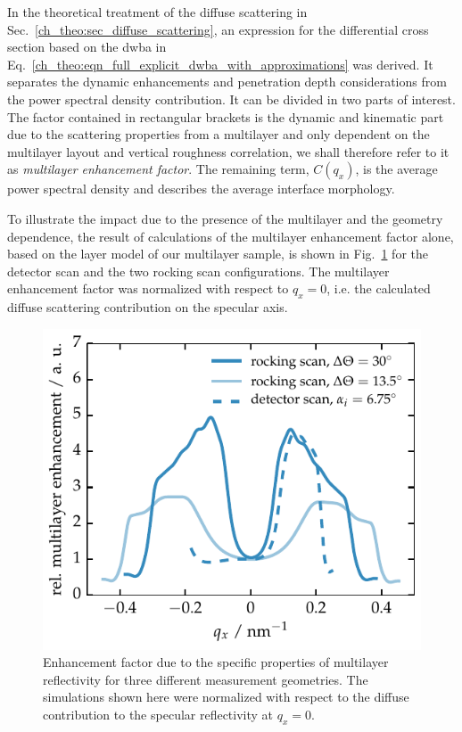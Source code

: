 In the theoretical treatment of the diffuse scattering in Sec.~\ref{ch_theo:sec_diffuse_scattering}, an expression for the differential cross section based on the \gls{dwba} in Eq.~\eqref{ch_theo:eqn_full_explicit_dwba_with_approximations} was derived. It separates the dynamic enhancements and penetration depth considerations from the power spectral density contribution. It can be divided in two parts of interest. The factor contained in rectangular brackets is the dynamic and kinematic part due to the scattering properties from a multilayer and only dependent on the multilayer layout and vertical roughness correlation, we shall therefore refer to it as \emph{multilayer enhancement factor}. The remaining term, $C(q_x)$, is the average power spectral density and describes the average interface morphology.

To illustrate the impact due to the presence of the multilayer and the geometry dependence, the result of calculations of the multilayer enhancement factor alone, based on the layer model of our multilayer sample, is shown in Fig.~\ref{ch_diff:fig_PTB17_multilayer_enhancement_factor} for the detector scan and the two rocking scan configurations. The multilayer enhancement factor was normalized with respect to $q_x=0$, i.e. the calculated diffuse scattering contribution on the specular axis.
\begin{figure}[htbp]
	\includegraphics{img/PTB17_multilayer_enhancement_factor} \caption{Enhancement factor due to the specific properties of multilayer reflectivity for three different measurement geometries. The simulations shown here were normalized with respect to the diffuse contribution to the specular reflectivity at $q_x=0$.} \label{ch_diff:fig_PTB17_multilayer_enhancement_factor} 
\end{figure}
